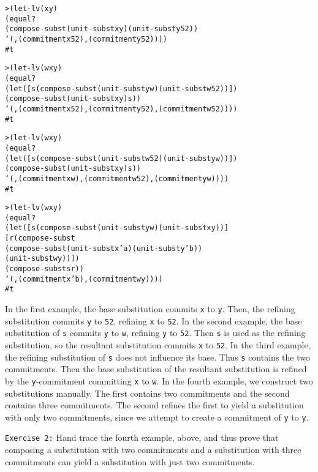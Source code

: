 \begin{alltt}
> (let-lv (x y)
    (equal?
      (compose-subst (unit-subst x y) (unit-subst y 52))
      `(,(commitment x 52) ,(commitment y 52))))
#t

> (let-lv (w x y)
    (equal?
      (let ([s (compose-subst (unit-subst y w) (unit-subst w 52))])
        (compose-subst (unit-subst x y) s))
      `(,(commitment x 52) ,(commitment y 52) ,(commitment w 52))))
#t

> (let-lv (w x y)
    (equal?
      (let ([s (compose-subst (unit-subst w 52) (unit-subst y w))])
        (compose-subst (unit-subst x y) s))
      `(,(commitment x w) ,(commitment w 52) ,(commitment y w))))
#t
\end{alltt}

\begin{alltt}
> (let-lv (w x y)
    (equal?
      (let ([s (compose-subst (unit-subst y w) (unit-subst x y))]
            [r (compose-subst
                 (compose-subst (unit-subst x 'a) (unit-subst y 'b))
                 (unit-subst w y))])
        (compose-subst s r))
      `(,(commitment x 'b) ,(commitment w y))))
#t
\end{alltt}
In the first example, the base substitution commits \texttt{x} to
\texttt{y}.  Then, the refining substitution commits \texttt{y} to
\texttt{52}, refining \texttt{x} to \texttt{52}.  In the second
example, the base substitution of \texttt{s} commits \texttt{y} to
\texttt{w}, refining \texttt{y} to \texttt{52}.  Then \texttt{s} is
used as the refining substitution, so the resultant substitution
commits \texttt{x} to \texttt{52}.  In the third example, the refining
substitution of \texttt{s} does not influence its base.  Thus
\texttt{s} contains the two commitments.  Then the base substitution
of the resultant substitution is refined by the \texttt{y}-commitment committing
\texttt{x} to \texttt{w}.  In the fourth example, we construct two
substitutions manually.  The first contains two commitments and the
second contains three commitments.  The second refines the first to
yield a substitution with only two commitments, since we attempt to
create a commitment of \texttt{y} to \texttt{y}.

\noindent
\texttt{Exercise 2:} Hand trace the fourth example, above, and
thus prove that composing a substitution with two commitments and
a substitution with three commitments can yield a substitution
with just two commitments.\endofexercise

